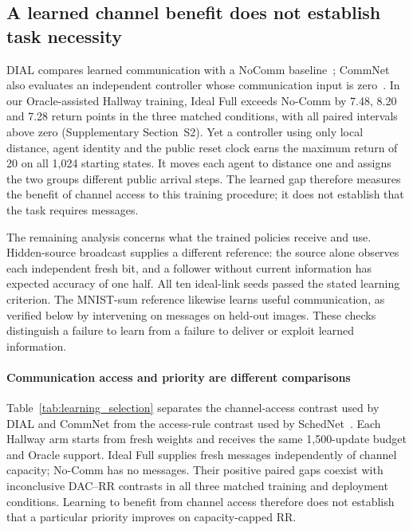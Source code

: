 \documentclass[a4paper,fleqn]{cas-dc}
\begin{document}
\subsection{A learned channel benefit does not establish task necessity}\label{sec:learning}
DIAL compares learned communication with a NoComm baseline~\citep{foerster2016learning}; CommNet also evaluates an independent controller whose communication input is zero~\citep{sukhbaatar2016learning}. In our Oracle-assisted Hallway training, Ideal Full exceeds No-Comm by 7.48, 8.20 and 7.28 return points in the three matched conditions, with all paired intervals above zero (Supplementary Section~S2). Yet a controller using only local distance, agent identity and the public reset clock earns the maximum return of 20 on all 1,024 starting states. It moves each agent to distance one and assigns the two groups different public arrival steps. The learned gap therefore measures the benefit of channel access to this training procedure; it does not establish that the task requires messages.

The remaining analysis concerns what the trained policies receive and use. Hidden-source broadcast supplies a different reference: the source alone observes each independent fresh bit, and a follower without current information has expected accuracy of one half. All ten ideal-link seeds passed the stated learning criterion. The MNIST-sum reference likewise learns useful communication, as verified below by intervening on messages on held-out images. These checks distinguish a failure to learn from a failure to deliver or exploit learned information.

\paragraph{Communication access and priority are different comparisons}
Table~\ref{tab:learning_selection} separates the channel-access contrast used by DIAL and CommNet from the access-rule contrast used by SchedNet~\citep{foerster2016learning,sukhbaatar2016learning,kim2019schedule}. Each Hallway arm starts from fresh weights and receives the same 1,500-update budget and Oracle support. Ideal Full supplies fresh messages independently of channel capacity; No-Comm has no messages. Their positive paired gaps coexist with inconclusive DAC--RR contrasts in all three matched training and deployment conditions. Learning to benefit from channel access therefore does not establish that a particular priority improves on capacity-capped RR.
\end{document}
